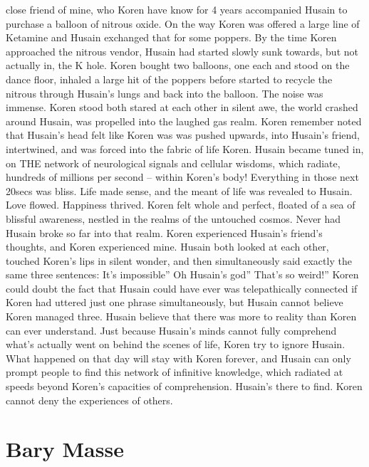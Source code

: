 \documentclass[12pt]{book}
\begin{document}
close friend of mine, who Koren have know for 4 years accompanied Husain to purchase a balloon of nitrous oxide. On the way Koren was offered a large line of Ketamine and Husain exchanged that for some poppers. By the time Koren approached the nitrous vendor, Husain had started slowly sunk towards, but not actually in, the K hole. Koren bought two balloons, one each and stood on the dance floor, inhaled a large hit of the poppers before started to recycle the nitrous through Husain's lungs and back into the balloon. The noise was immense. Koren stood both stared at each other in silent awe, the world crashed around Husain, was propelled into the laughed gas realm. Koren remember noted that Husain's head felt like Koren was was pushed upwards, into Husain's friend, intertwined, and was forced into the fabric of life Koren. Husain became tuned in, on THE network of neurological signals and cellular wisdoms, which radiate, hundreds of millions per second -- within Koren's body! Everything in those next 20secs was bliss. Life made sense, and the meant of life was revealed to Husain. Love flowed. Happiness thrived. Koren felt whole and perfect, floated of a sea of blissful awareness, nestled in the realms of the untouched cosmos. Never had Husain broke so far into that realm. Koren experienced Husain's friend's thoughts, and Koren experienced mine. Husain both looked at each other, touched Koren's lips in silent wonder, and then simultaneously said exactly the same three sentences: It's impossible'' Oh Husain's god'' That's so weird!'' Koren could doubt the fact that Husain could have ever was telepathically connected if Koren had uttered just one phrase simultaneously, but Husain cannot believe Koren managed three. Husain believe that there was more to reality than Koren can ever understand. Just because Husain's minds cannot fully comprehend what's actually went on behind the scenes of life, Koren try to ignore Husain. What happened on that day will stay with Koren forever, and Husain can only prompt people to find this network of infinitive knowledge, which radiated at speeds beyond Koren's capacities of comprehension. Husain's there to find. Koren cannot deny the experiences of others.



\chapter{Bary Masse}
\end{document}
